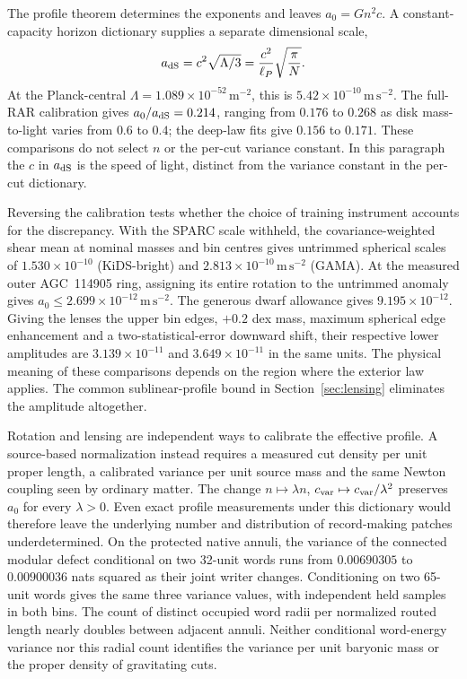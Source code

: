 \documentclass[11pt]{article}
\begin{document}
The profile theorem determines the exponents and leaves \(a_0=Gn^2c\).
A constant-capacity horizon dictionary supplies a separate dimensional scale,
\begin{equation}
 a_{\rm dS}=c^2\sqrt{\Lambda/3}
 =\frac{c^2}{\ell_P}\sqrt{\frac{\pi}{N}}.
 \label{eq:horizon-scale}
\end{equation}
At the Planck-central \(\Lambda=1.089\times10^{-52}\,\mathrm{m^{-2}}\),
this is \(5.42\times10^{-10}\,\mathrm{m\,s^{-2}}\). The full-RAR
calibration gives \(a_0/a_{\rm dS}=0.214\), ranging from \(0.176\) to
\(0.268\) as disk mass-to-light varies from \(0.6\) to \(0.4\);
the deep-law fits give \(0.156\) to \(0.171\). These comparisons do not
select \(n\) or the per-cut variance constant. In this paragraph the
\(c\) in \(a_{\rm dS}\) is the speed of light, distinct from the variance
constant in the per-cut dictionary.

Reversing the calibration tests whether the choice of training
instrument accounts for the discrepancy. With the SPARC scale
withheld, the covariance-weighted shear mean at nominal masses and
bin centres gives untrimmed spherical scales of $1.530\times10^{-10}$
(KiDS-bright) and $2.813\times10^{-10}\,\mathrm{m\,s^{-2}}$ (GAMA).
At the measured outer AGC~114905 ring, assigning its entire rotation
to the untrimmed anomaly gives $a_0\le2.699\times10^{-12}\,\mathrm{m\,s^{-2}}$.
The generous dwarf allowance gives $9.195\times10^{-12}$. Giving the
lenses the upper bin edges, $+0.2$ dex mass, maximum spherical edge
enhancement and a two-statistical-error downward shift, their respective
lower amplitudes are $3.139\times10^{-11}$ and $3.649\times10^{-11}$
in the same units. The physical meaning of these comparisons depends on
the region where the exterior law applies. The common sublinear-profile
bound in Section~\ref{sec:lensing} eliminates the amplitude altogether.

Rotation and lensing are independent ways to calibrate the effective
profile. A source-based normalization instead requires a measured cut
density per unit proper length, a calibrated variance per unit source
mass and the same Newton coupling seen by ordinary matter. The change
$n\mapsto\lambda n$, $c_{\rm var}\mapsto c_{\rm var}/\lambda^2$ preserves
$a_0$ for every $\lambda>0$. Even exact profile measurements under this
dictionary would therefore leave the underlying number and distribution
of record-making patches underdetermined. On the protected native annuli,
the variance of the connected modular defect conditional on two
32-unit words runs from $0.00690305$ to $0.00900036$ nats squared as
their joint writer changes. Conditioning on two 65-unit words gives
the same three variance values, with independent held samples in both
bins. The count of distinct occupied word radii per normalized routed
length nearly doubles between adjacent annuli. Neither conditional
word-energy variance nor this radial count identifies the variance per
unit baryonic mass or the proper density of gravitating cuts.
\end{document}
